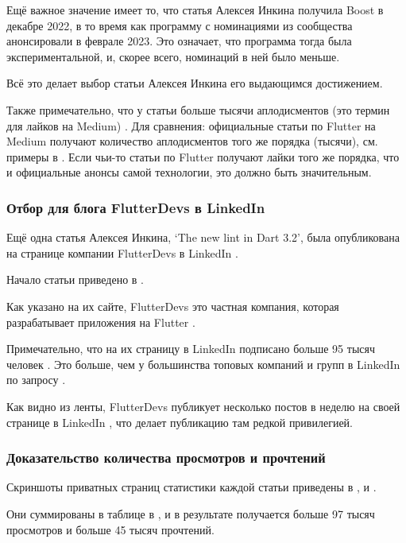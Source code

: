 Ещё важное значение имеет то, что статья Алексея Инкина получила Boost в декабре 2022,
в то время как программу с номинациями из сообщества анонсировали в феврале 2023.
Это означает, что программа тогда была экспериментальной, и, скорее всего, номинаций в ней было меньше.

Всё это делает выбор статьи Алексея Инкина его выдающимся достижением.

Также примечательно, что у статьи больше тысячи аплодисментов (это термин для лайков на Medium) .
Для сравнения: официальные статьи по Flutter на Medium получают количество аплодисментов того же порядка (тысячи),
см. примеры в .
Если чьи-то статьи по Flutter получают лайки того же порядка,
что и официальные анонсы самой технологии, это должно быть значительным.


\subsubsection{Отбор для блога FlutterDevs в LinkedIn}

Ещё одна статья Алексея Инкина, `The new lint in Dart 3.2',
была опубликована на странице компании FlutterDevs в LinkedIn .

Начало статьи приведено в .

Как указано на их сайте, FlutterDevs это частная компания,
которая разрабатывает приложения на Flutter .

Примечательно, что на их страницу в LinkedIn подписано больше 95 тысяч человек .
Это больше, чем у большинства топовых компаний и групп в LinkedIn по запросу 
.

Как видно из ленты,
FlutterDevs публикует несколько постов в неделю на своей странице в LinkedIn ,
что делает публикацию там редкой привилегией.


\subsubsection{%
    Доказательство количества просмотров и прочтений%
}

Скриншоты приватных страниц статистики каждой статьи приведены в
,  и .

Они суммированы в таблице в , и в результате получается больше 97 тысяч просмотров и больше 45 тысяч прочтений.

\pagebreak
